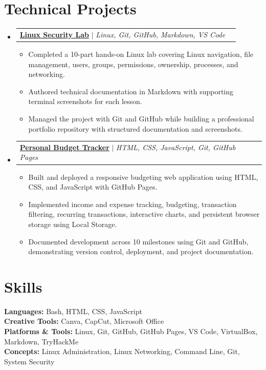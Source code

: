 \documentclass[letterpaper,11pt]{article}
\makeatletter
\newcommand{\resumeItem}[1]{
  \item\small{{#1 \vspace{-2pt}}}
}
\newcommand{\resumeProjectHeading}[2]{
    \item
    \begin{tabular*}{0.97\textwidth}{l@{\extracolsep{\fill}}r}
      \small#1 & #2 \\
    \end{tabular*}\vspace{-7pt}
}
\newcommand{\resumeSubHeadingListStart}{\begin{itemize}[leftmargin=0.15in, label={}]}
\newcommand{\resumeSubHeadingListEnd}{\end{itemize}}
\newcommand{\resumeItemListStart}{\begin{itemize}}
\newcommand{\resumeItemListEnd}{\end{itemize}\vspace{-5pt}}
\makeatother
\begin{document}
\section{Technical Projects}
\resumeSubHeadingListStart

\resumeProjectHeading
{\href{https://github.com/donaldchiem/linux-security-lab}{\textbf{Linux Security Lab}} $|$ \emph{Linux, Git, GitHub, Markdown, VS Code}}{}
\resumeItemListStart
\resumeItem{Completed a 10-part hands-on Linux lab covering Linux navigation, file management, users, groups, permissions, ownership, processes, and networking.}
\resumeItem{Authored technical documentation in Markdown with supporting terminal screenshots for each lesson.}
\resumeItem{Managed the project with Git and GitHub while building a professional portfolio repository with structured documentation and screenshots.}
\resumeItemListEnd

\resumeProjectHeading
{\href{https://github.com/donaldchiem/budget-tracker}{\textbf{Personal Budget Tracker}} $|$ \emph{HTML, CSS, JavaScript, Git, GitHub Pages}}{}
\resumeItemListStart
\resumeItem{Built and deployed a responsive budgeting web application using HTML, CSS, and JavaScript with GitHub Pages.}
\resumeItem{Implemented income and expense tracking, budgeting, transaction filtering, recurring transactions, interactive charts, and persistent browser storage using Local Storage.}
\resumeItem{Documented development across 10 milestones using Git and GitHub, demonstrating version control, deployment, and project documentation.}
\resumeItemListEnd

\resumeSubHeadingListEnd


\section{Skills}

\begin{itemize}[leftmargin=0.15in, label={}]
\small{
\item{
\textbf{Languages:} Bash, HTML, CSS, JavaScript \\
\textbf{Creative Tools:} Canva, CapCut, Microsoft Office \\
\textbf{Platforms \& Tools:} Linux, Git, GitHub, GitHub Pages, VS Code, VirtualBox, Markdown, TryHackMe \\
\textbf{Concepts:} Linux Administration, Linux Networking, Command Line, Git, System Security
}}
\end{itemize}

\end{document}
